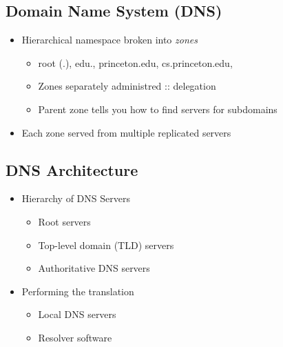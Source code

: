 \subsection{Domain Name System (DNS)}
\begin{figure}[H]
\end{figure}
\begin{itemize}[nosep]
    \item Hierarchical namespace broken into \emph{zones}
          \begin{itemize}[nosep]
              \item root (.), edu., princeton.edu, cs.princeton.edu,
              \item Zones separately administred :: delegation
              \item Parent zone tells you how to find servers for subdomains
          \end{itemize}
    \item Each zone served from multiple replicated servers
\end{itemize}
\subsection{DNS Architecture}
\begin{itemize}[nosep]
    \item Hierarchy of DNS Servers
          \begin{itemize}[nosep]
              \item Root servers
              \item Top-level domain (TLD) servers
              \item Authoritative DNS servers
          \end{itemize}
    \item Performing the translation
          \begin{itemize}[nosep]
              \item Local DNS servers
              \item Resolver software
          \end{itemize}
\end{itemize}
